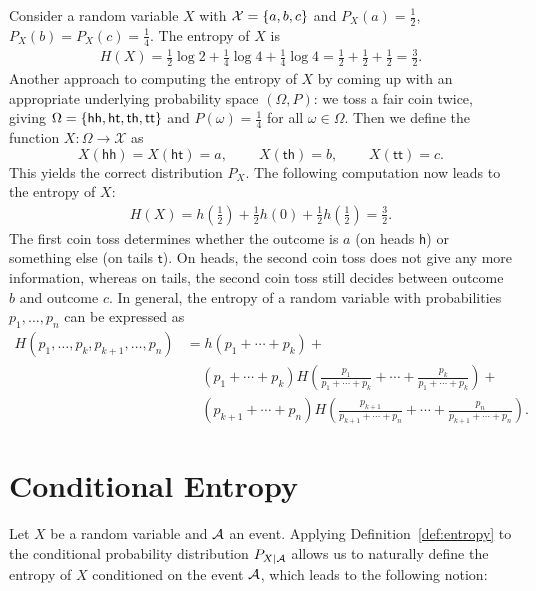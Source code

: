 \begin{example}
Consider a random variable $X$ with $\mathcal{X} = \{a,b,c\}$ and $P_X(a) = \frac{1}{2}$, $P_X(b) = P_X(c) = \frac{1}{4}$. The entropy of $X$ is
\begin{align}
H(X) = \frac{1}{2} \log 2 + \frac{1}{4} \log 4 + \frac{1}{4} \log 4 = \frac{1}{2} + \frac{1}{2} + \frac{1}{2} = \frac{3}{2}.
\end{align}
Another approach to computing the entropy of $X$ by coming up with an appropriate underlying probability space $(\Omega,P)$: we toss a fair coin twice, giving $\Omega = \{\mathsf{hh}, \mathsf{ht}, \mathsf{th}, \mathsf{tt}\}$ and $P(\omega) = \frac{1}{4}$ for all $\omega \in \Omega$. Then we define the function $X : \Omega \to \mathcal{X}$ as
\[
X(\mathsf{hh}) = X(\mathsf{ht}) = a, \ \ \ \ \ \ \ \ \ \ X(\mathsf{th}) = b, \ \ \ \ \ \ \ \ \ \ X(\mathsf{tt}) = c.
\]
This yields the correct distribution $P_X$. The following computation now leads to the entropy of $X$:
\begin{align}
H(X) = h\left(\frac{1}{2}\right) + \frac{1}{2}h(0) + \frac{1}{2}h\left(\frac{1}{2}\right) = \frac{3}{2}.
\end{align}
The first coin toss determines whether the outcome is $a$ (on heads $\mathsf{h}$) or something else (on tails $\mathsf{t}$). On heads, the second coin toss does not give any more information, whereas on tails, the second coin toss still decides between outcome $b$ and outcome $c$. In general, the entropy of a random variable with probabilities $p_1, \ldots, p_n$ can be expressed as
\begin{align}
H(p_1, \ldots, p_k, p_{k+1}, \ldots, p_n) &= h(p_1 + \cdots + p_k) +\nonumber\\
&\ \ \ \ \ (p_1 + \cdots + p_k) H\left(\frac{p_1}{p_1+\cdots+p_k} + \cdots + \frac{p_k}{p_1+\cdots+p_k}\right) +\nonumber\\
&\ \ \ \ \ (p_{k+1} + \cdots + p_n)H\left(\frac{p_{k+1}}{p_{k+1}+\cdots+p_n} + \cdots + \frac{p_n}{p_{k+1}+\cdots+p_n}\right).
\end{align}
\end{example}

\section{Conditional Entropy}
Let $X$ be a random variable and $\cal A$ an event. Applying Definition~\ref{def:entropy} to the conditional probability distribution $P_{X|\cal A}$ allows us to naturally define the entropy of $X$ conditioned on the event $\cal A$, which leads to the following notion:


